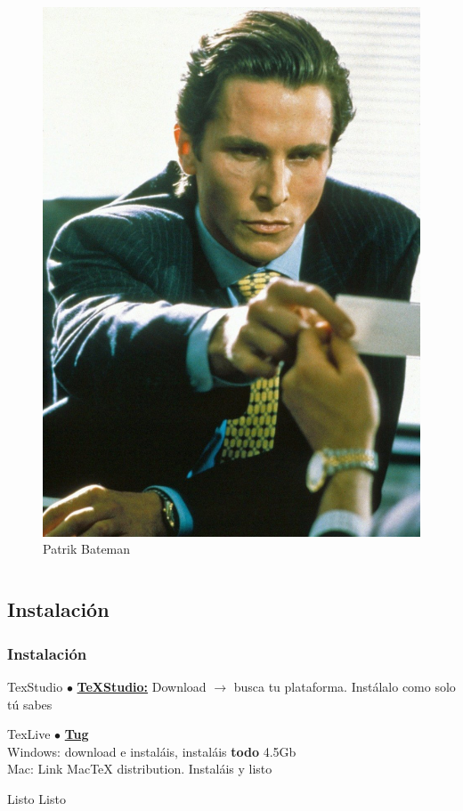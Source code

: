 \documentclass{beamer}
\begin{document}
\begin{frame}
\begin{columns}[c]
		\vspace{10px}
		\begin{figure}
			\centering
			\includegraphics[width=0.7\linewidth]{images/patrick-bateman-business-card-scene-american-psycho}
			\caption{Patrik Bateman}
		\end{figure}
	\end{columns}
\end{frame}

\subsection{Instalación}

\begin{frame}
\frametitle{Instalación}

\begin{block}{TexStudio}
$\bullet$ \href{http://www.texstudio.org/}{\textbf{\TeX Studio:}} Download $\rightarrow$ busca tu plataforma. Instálalo como solo tú sabes
\end{block}

\begin{block}{TexLive}
$\bullet$ \href{https://www.tug.org/texlive/}{\textbf{Tug}} \\
Windows: download e instaláis, instaláis \textbf{todo} 4.5Gb \\
Mac: Link MacTeX distribution. Instaláis y listo
\end{block}

\begin{block}{Listo}
Listo
\end{block}
\end{frame}
\end{document}
